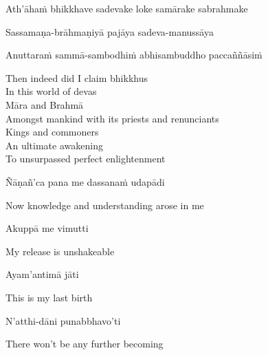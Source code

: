 \ifninebythirteen\clearpage\fi

\begin{pali-hang}
Ath'āhaṁ bhikkhave sadevake loke samārake sabrahmake\\
\end{pali-hang}
\begin{pali-hang-together}
Sassamaṇa-brāhmaṇiyā pajāya sadeva-manussāya\\
\end{pali-hang-together}
\begin{pali-hang-together}
Anuttaraṁ sammā-sambodhiṁ abhisambuddho paccaññāsiṁ
\end{pali-hang-together}

\begin{english-verses}
  Then indeed did I claim bhikkhus\\
  In this world of devas\\
  Māra and Brahmā\\
  Amongst mankind with its priests and renunciants\\
  Kings and commoners\\
  An ultimate awakening\\
  To unsurpassed perfect enlightenment
\end{english-verses}

Ñāṇañ'ca pana me dassanaṁ udapādi

\begin{english}
  Now knowledge and understanding arose in me
\end{english}

Akuppā me vimutti

\begin{english}
  My release is unshakeable
\end{english}

Ayam'antimā jāti

\begin{english}
  This is my last birth
\end{english}

N'atthi-dāni punabbhavo'ti

\begin{english}
  There won't be any further becoming
\end{english}

\ifninebythirteen\vspace{-1em}\fi

\suttaRef{[SN 56.11]}

\ifdigital{}\fi



